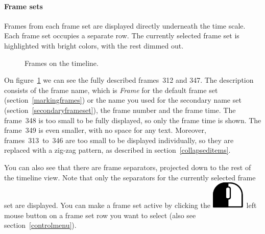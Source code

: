 \documentclass[hidelinks,titlepage,a4paper]{article}
\newcommand{\LMB}{\includegraphics[height=.8\baselineskip]{icons/lmb}}
\begin{document}
\paragraph{Frame sets}
\label{framesets}

Frames from each frame set are displayed directly underneath the time scale. Each frame set occupies a separate row. The currently selected frame set is highlighted with bright colors, with the rest dimmed out.

\begin{figure}[h]
\centering{}
\caption{Frames on the timeline.}
\label{framesetsfig}
\end{figure}

On figure~\ref{framesetsfig} we can see the fully described frames~312 and 347. The description consists of the frame name, which is \emph{Frame} for the default frame set (section~\ref{markingframes}) or the name you used for the secondary name set (section~\ref{secondaryframeset}), the frame number and the frame time. The frame~348 is too small to be fully displayed, so only the frame time is shown. The frame~349 is even smaller, with no space for any text. Moreover, frames~313~to~346 are too small to be displayed individually, so they are replaced with a zig-zag pattern, as described in section~\ref{collapseditems}.

You can also see that there are frame separators, projected down to the rest of the timeline view. Note that only the separators for the currently selected frame set are displayed. You can make a frame set active by clicking the \LMB{}~left mouse button on a frame set row you want to select (also see section~\ref{controlmenu}).
\end{document}
